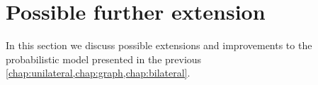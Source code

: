 \documentclass[\relativeRoot/main.tex]{subfiles}
\begin{document}
\chapter{Possible further extension}
\label{chap:extensions}
\globalreset

In this section we discuss possible extensions and improvements to the probabilistic model presented in the previous \cref{chap:unilateral,chap:graph,chap:bilateral}.






\end{document}
